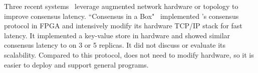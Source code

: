 % 
% 






  Three recent
systems~\cite{specpaxos:nsdi15,nopaxos:osdi16,hardware:paxos:nsdi16} leverage 
augmented network hardware or topology to improve \paxos consensus latency. 
``Consensus in a Box"~\cite{hardware:paxos:nsdi16} implemented \zookeeper's 
consensus protocol in FPGA and intensively modify its hardware TCP/IP stack for 
fast latency. It implemented a key-value store in hardware and showed similar 
consensus latency to \xxx on 3 or 5 replicas. It did not discuss or evaluate 
its scalability. Compared to this protocol, \xxx does not need to modify 
hardware, so it is easier to deploy and support general programs.

